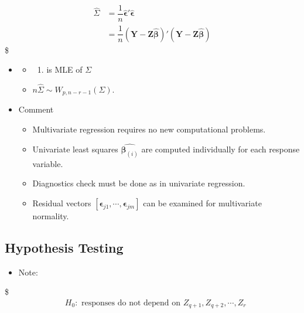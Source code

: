 \documentclass[
]{book}
\providecommand{\tightlist}{%
  \setlength{\itemsep}{0pt}\setlength{\parskip}{0pt}}
\begin{document}
{{\begin{align*}
\hat \Sigma &= \dfrac{1}{n} \hat {\pmb \epsilon} ' \hat {\pmb \epsilon} \\
&= \dfrac{1}{n} (\pmb Y - \pmb Z \hat {\pmb \beta}) ' (\pmb Y - \pmb Z \hat {\pmb \beta}) \tag{5}

\end{align*}
\$

\begin{itemize}
\item
  \begin{itemize}
  \item
    \begin{enumerate}
    \def\labelenumi{(\arabic{enumi})}
    \setcounter{enumi}{4}
    \tightlist
    \item
      is MLE of \(\Sigma\)
    \end{enumerate}
  \item
    \(n \hat \Sigma \sim W_{p,n-r-1} (\Sigma)\).
  \end{itemize}
\item
  Comment

  \begin{itemize}
  \tightlist
  \item
    Multivariate regression requires no new computational problems.
  \item
    Univariate least squares \(\hat {\pmb \beta_{(i)}}\) are computed individually for each response variable.
  \item
    Diagnostics check must be done as in univariate regression.
  \item
    Residual vectors \([ \pmb \epsilon_{j1}, \cdots, \pmb \epsilon_{jm} ]\) can be examined for multivariate normality.
  \end{itemize}
\end{itemize}

\hypertarget{hypothesis-testing}{%
\subsection{Hypothesis Testing}\label{hypothesis-testing}}

\begin{itemize}
\tightlist
\item
  Note:
\end{itemize}

\$
\begin{align*}

&H_0: \text{ responses do not depend on } Z_{q+1}, Z_{q+2}, \cdots, Z_{r} \\


\end{align*}}}
\end{document}
